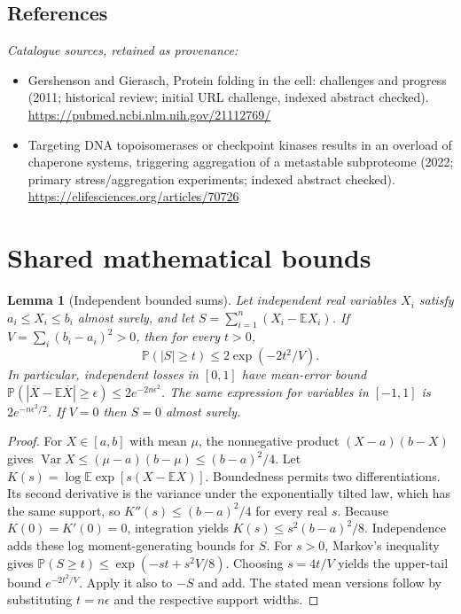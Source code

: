 \documentclass[11pt]{article}
\newcommand{\E}{\mathbb E}
\newcommand{\Prob}{\mathbb P}
\DeclareMathOperator{\Var}{Var}
\providecommand{\E}{\mathbb E}
\providecommand{\Prob}{\mathbb P}
\providecommand{\Var}{\operatorname{Var}}
\newtheorem{sharedlemma}{Lemma}[section]
\begin{document}
\subsection{References}
\noindent\emph{Catalogue sources, retained as provenance:}
\begin{itemize}
\item Gershenson and Gierasch, Protein folding in the cell: challenges and progress (2011; historical review; initial URL challenge, indexed abstract checked). \url{https://pubmed.ncbi.nlm.nih.gov/21112769/}
\item Targeting DNA topoisomerases or checkpoint kinases results in an overload of chaperone systems, triggering aggregation of a metastable subproteome (2022; primary stress/aggregation experiments; indexed abstract checked). \url{https://elifesciences.org/articles/70726}
\end{itemize}
\clearpage


\appendix
\section{Shared mathematical bounds}\label{app:bounds}
\begin{sharedlemma}[Independent bounded sums]\label{lem:bounded}
Let independent real variables $X_i$ satisfy $a_i\leq X_i\leq b_i$ almost surely,
and let $S=\sum_{i=1}^n(X_i-\E X_i)$. If
$V=\sum_i(b_i-a_i)^2>0$, then for every $t>0$,
\[
 \Prob(|S|\geq t)\leq 2\exp(-2t^2/V).
\]
In particular, independent losses in $[0,1]$ have mean-error bound
$\Prob(|\overline X-\E\overline X|\geq\epsilon)
\leq2e^{-2n\epsilon^2}$. The same expression for variables in $[-1,1]$
is $2e^{-n\epsilon^2/2}$. If $V=0$ then $S=0$ almost surely.
\end{sharedlemma}
\begin{proof}
For $X\in[a,b]$ with mean $\mu$, the nonnegative product
$(X-a)(b-X)$ gives
$\Var X\leq(\mu-a)(b-\mu)\leq(b-a)^2/4$.
Let $K(s)=\log\E\exp[s(X-\E X)]$.
Boundedness permits two differentiations. Its second derivative is the variance
under the exponentially tilted law, which has the same support, so
$K''(s)\leq(b-a)^2/4$ for every real $s$.
Because $K(0)=K'(0)=0$, integration yields
$K(s)\leq s^2(b-a)^2/8$.
Independence adds these log moment-generating bounds for $S$.
For $s>0$, Markov's inequality gives
$\Prob(S\geq t)\leq\exp(-st+s^2V/8)$.
Choosing $s=4t/V$ yields the upper-tail bound $e^{-2t^2/V}$.
Apply it also to $-S$ and add. The stated mean versions follow by substituting
$t=n\epsilon$ and the respective support widths.
\end{proof}
\end{document}
